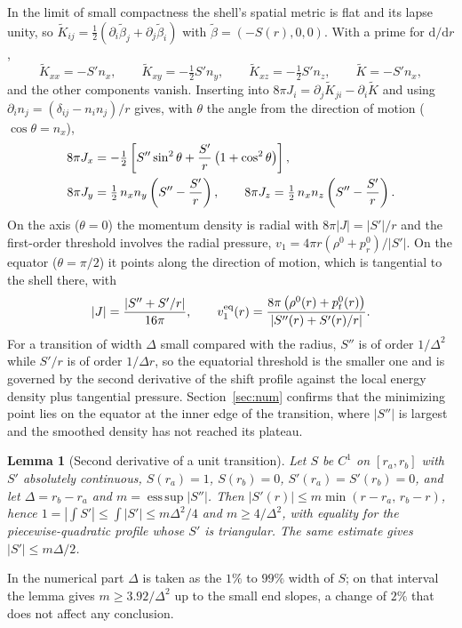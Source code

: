 \documentclass[11pt,a4paper]{article}
\newtheorem{lemma}{Lemma}
\theoremstyle{remark}
\newcommand{\dd}{\mathrm{d}}
\newcommand{\Ks}{\tilde K}
\newcommand{\bs}{\tilde\beta}
\begin{document}
In the limit of small compactness the shell's spatial metric is flat and its lapse unity, so $\Ks_{ij} = \tfrac12(\partial_i\bs_j + \partial_j\bs_i)$ with $\bs = (-S(r),0,0)$. With a prime for $\dd/\dd r$,
\begin{equation}
\Ks_{xx} = -S'n_x, \qquad \Ks_{xy} = -\tfrac12 S'n_y, \qquad \Ks_{xz} = -\tfrac12 S'n_z, \qquad \Ks = -S'n_x ,
\end{equation}
and the other components vanish. Inserting into $8\pi J_i = \partial_j\Ks_{ji} - \partial_i\Ks$ and using $\partial_i n_j = (\delta_{ij} - n_in_j)/r$ gives, with $\theta$ the angle from the direction of motion ($\cos\theta = n_x$),
\begin{align}
8\pi J_x &= -\tfrac12\left[S''\sin^2\theta + \frac{S'}{r}\left(1+\cos^2\theta\right)\right], \notag\\
8\pi J_y &= \tfrac12\,n_xn_y\left(S'' - \frac{S'}{r}\right), \qquad
8\pi J_z = \tfrac12\,n_xn_z\left(S'' - \frac{S'}{r}\right).
\label{eq:Jweak}
\end{align}
On the axis ($\theta = 0$) the momentum density is radial with $8\pi|J| = |S'|/r$ and the first-order threshold involves the radial pressure, $v_1 = 4\pi r(\rho^0 + p_r^0)/|S'|$. On the equator ($\theta = \pi/2$) it points along the direction of motion, which is tangential to the shell there, with
\begin{equation}
|J| = \frac{|S'' + S'/r|}{16\pi}, \qquad
v_1^{\rm eq}(r) = \frac{8\pi\left(\rho^0(r) + p_t^0(r)\right)}{|S''(r) + S'(r)/r|}.
\label{eq:veq}
\end{equation}
For a transition of width $\Delta$ small compared with the radius, $S''$ is of order $1/\Delta^2$ while $S'/r$ is of order $1/\Delta r$, so the equatorial threshold is the smaller one and is governed by the second derivative of the shift profile against the local energy density plus tangential pressure. Section~\ref{sec:num} confirms that the minimizing point lies on the equator at the inner edge of the transition, where $|S''|$ is largest and the smoothed density has not reached its plateau.

\begin{lemma}[Second derivative of a unit transition]\label{lem:S}
Let $S$ be $C^1$ on $[r_a, r_b]$ with $S'$ absolutely continuous, $S(r_a) = 1$, $S(r_b) = 0$, $S'(r_a) = S'(r_b) = 0$, and let $\Delta = r_b - r_a$ and $m = \operatorname{ess\,sup}|S''|$. Then $|S'(r)| \le m\min(r-r_a,\, r_b-r)$, hence $1 = \left|\int S'\right| \le \int|S'| \le m\Delta^2/4$ and $m \ge 4/\Delta^2$, with equality for the piecewise-quadratic profile whose $S'$ is triangular. The same estimate gives $|S'| \le m\Delta/2$.
\end{lemma}
In the numerical part $\Delta$ is taken as the $1\%$ to $99\%$ width of $S$; on that interval the lemma gives $m \ge 3.92/\Delta^2$ up to the small end slopes, a change of $2\%$ that does not affect any conclusion.
\end{document}

